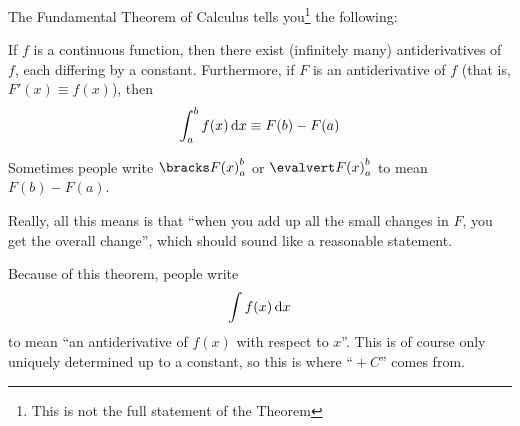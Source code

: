The Fundamental Theorem of Calculus tells you\footnote{
 This is not the full statement of the Theorem
} the following:
\begin{tcolorbox}
 If \(f\) is a continuous function, then there exist (infinitely many)
 antiderivatives of \(f\), each differing by a constant. Furthermore, if \(F\)
 is an antiderivative of \(f\) (that is, \(F'(x) \equiv f(x)\)), then
 \begin{equation*}
  \integ[a]<b>{f(x)}{x} \equiv F(b) - F(a)
 \end{equation*}
\end{tcolorbox}
Sometimes people write \(\eval{a}{b}{F(x)}\) or \(\evalline{a}{b}{F(x)}\) to
mean \(F(b) - F(a)\).

Really, all this means is that ``when you add up all the small changes in
\(F\), you get the overall change'', which should sound like a reasonable
statement.

Because of this theorem, people write
\begin{equation*}
 \integ{f(x)}{x}
\end{equation*}
to mean ``an antiderivative of \(f(x)\) with respect to \(x\)''. This is of
course only uniquely determined up to a constant, so this is where ``\({}+ C\)''
comes from.
